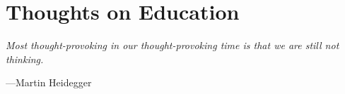 \chapter{Thoughts on Education}

\vspace{4mm}
\begin{displayquote}
	\textit{Most thought-provoking in our thought-provoking time is that we are still not thinking.}
	\vspace{2mm}
	\begin{flushright}
		---Martin Heidegger
	\end{flushright}
\end{displayquote}
\vspace{4mm}








